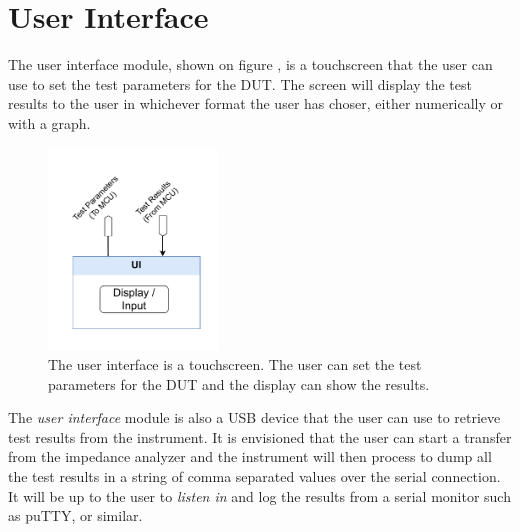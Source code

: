 \section{User Interface} \label{sec:UserInterface}
The user interface module, shown on figure , is a touchscreen that the user can use to set the test parameters for the DUT. The screen will display the test results to the user in whichever format the user has choser, either numerically or with a graph.

\begin{figure}[H]
    \centering
    \includegraphics[clip, trim=18 0 18 0,width=0.40\textwidth]{Sections/6_SystemArchitecture/Figures/UI.pdf}
    \caption{The user interface is a touchscreen. The user can set the test parameters for the DUT and the display can show the results.}
    \label{fig_6_5_UserInterface}
\end{figure}

The \textit{user interface} module is also a USB device that the user can use to retrieve test results from the instrument. It is envisioned that the user can start a transfer from the impedance analyzer and the instrument will then process to dump all the test results in a string of comma separated values over the serial connection. It will be up to the user to \textit{listen in} and log the results from a serial monitor such as puTTY, or similar.
